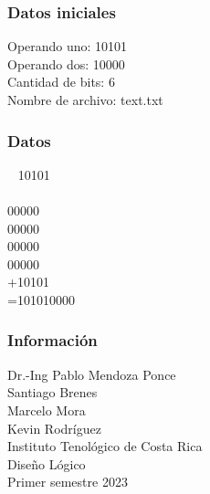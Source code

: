 \documentclass{beamer}
\begin{document}
\begin{frame}\frametitle{Datos iniciales}Operando uno: 10101\\Operando dos: 10000\\Cantidad de bits: 6\\Nombre de archivo: text.txt\end{frame}
\begin{frame}\frametitle{Datos}\,\,\,\,\,10101\\\\00000\\00000\\00000\\00000\\+10101\\=101010000\end{frame}
\begin{frame}\frametitle{Informaci\'on}Dr.-Ing Pablo Mendoza Ponce \\ Santiago Brenes \\ Marcelo Mora \\ Kevin Rodr\'iguez \\ Instituto Tenol\'ogico de Costa Rica \\ Dise\~{n}o L\'ogico \\ Primer semestre 2023\end{frame}
\end{document}
